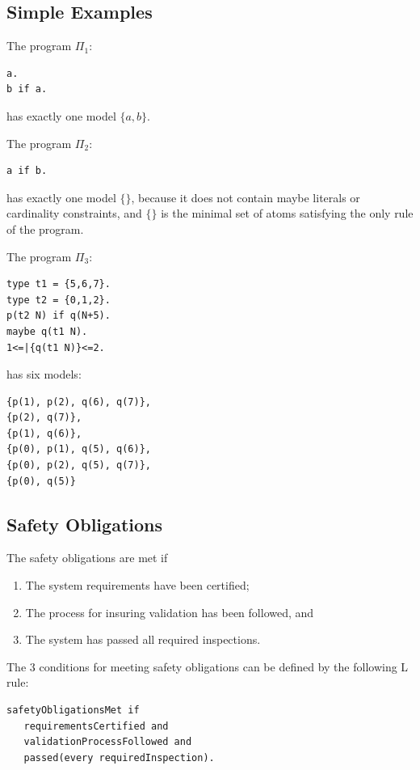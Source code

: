 \documentclass[a4paper,10pt]{article}
\begin{document}
\subsection{Simple Examples} 

The program $\Pi_1$:
\begin{verbatim}
a.
b if a.
\end{verbatim}
has exactly one model $\{a,b\}$.

\medskip\noindent
The program $\Pi_2$:
\begin{verbatim}
a if b.
\end{verbatim}
has exactly one model $\{\}$, because it  does not contain maybe literals or cardinality constraints, and $\{\}$ is the minimal set of atoms satisfying the only rule of the program.

\medskip\noindent
The program $\Pi_3$:
\begin{verbatim}
type t1 = {5,6,7}.
type t2 = {0,1,2}.
p(t2 N) if q(N+5).
maybe q(t1 N).
1<=|{q(t1 N)}<=2. 
\end{verbatim}
has six models:
\begin{verbatim}
{p(1), p(2), q(6), q(7)},
{p(2), q(7)},
{p(1), q(6)},
{p(0), p(1), q(5), q(6)},
{p(0), p(2), q(5), q(7)},
{p(0), q(5)}
\end{verbatim}


\subsection{Safety Obligations}

The safety obligations are met if
\begin{enumerate}
 \item The system requirements have been certified;
 \item The process for insuring validation has been followed, and
  \item The system has passed all required inspections.
\end{enumerate}

\medskip\noindent
The 3 conditions for meeting safety obligations can be defined by the following L rule:

\begin{verbatim}
safetyObligationsMet if
   requirementsCertified and
   validationProcessFollowed and
   passed(every requiredInspection).
\end{verbatim}


\end{document}

